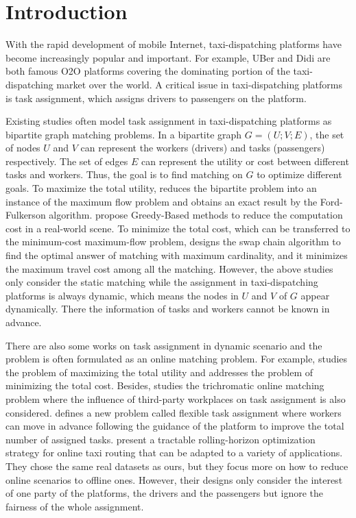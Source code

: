 \documentclass[color,twoside,amssymb,twocolumn]{article}
\begin{document}

\section{Introduction}

\noindent With the rapid development of mobile Internet, taxi-dispatching platforms have become increasingly popular and important. For example, UBer and Didi are both famous O2O platforms covering the dominating portion of the taxi-dispatching market over the world. A critical issue in taxi-dispatching platforms is task assignment, which assigns drivers to passengers on the platform. 

Existing studies often model task assignment in taxi-dispatching platforms as bipartite graph matching problems. In a bipartite graph $G=(U;V;E)$, the set of nodes $U$ and $V$ can represent the workers (drivers) and tasks (passengers) respectively. The set of edges $E$ can represent the utility or cost between different tasks and workers. Thus, the goal is to find matching on $G$ to optimize different goals. To maximize the total utility, \cite{kazemi2012geocrowd} reduces the bipartite problem into an instance of the maximum flow problem and obtains an exact result by the Ford-Fulkerson algorithm. \cite{to2016real,tran2018real} propose Greedy-Based methods to reduce the computation cost in a real-world scene. To minimize the total cost, which can be transferred to the minimum-cost maximum-flow problem\cite{ahuja1995network}, \cite{long2013optimal} designs the swap chain algorithm to find the optimal answer of matching with maximum cardinality, and it minimizes the maximum travel cost among all the matching. However, the above studies only consider the static matching while the assignment in taxi-dispatching platforms is always dynamic, which means the nodes in $U$ and $V$ of $G$ appear dynamically. There the information of tasks and workers cannot be known in advance.

There are also some works on task assignment in dynamic scenario and the problem is often formulated as an online matching problem.
For example, \cite{tong2016online} studies the problem of maximizing the total utility and \cite{DBLP:journals/pvldb/TongSDCWX16} addresses the problem of minimizing the total cost. Besides, \cite{song2017trichromatic} studies the trichromatic online matching problem where the influence of third-party workplaces on task assignment is also considered.
\cite{tong2017flexible} defines a new problem called flexible task assignment where workers can move in advance following the guidance of the platform to improve the total number of assigned tasks. \cite{bertsimas2019online} present a tractable rolling-horizon optimization strategy for online taxi routing that can be adapted to a variety of applications. They chose the same real datasets as ours, but they focus more on how to reduce online scenarios to offline ones.
However, their designs only consider the interest of one party of the platforms, the drivers and the passengers but ignore the fairness of the whole assignment.
\end{document}
